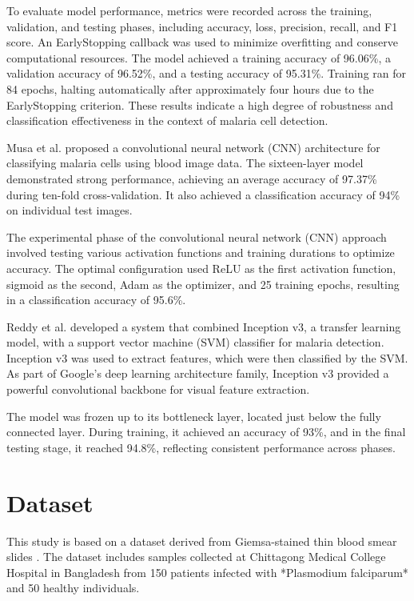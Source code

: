 \documentclass[journal,12pt,onecolumn,draftcls]{IEEEtran}
\begin{document}
To evaluate model performance, metrics were recorded across the training, validation, and testing phases, including accuracy, loss, precision, recall, and F1 score. An EarlyStopping callback was used to minimize overfitting and conserve computational resources. The model achieved a training accuracy of 96.06\%, a validation accuracy of 96.52\%, and a testing accuracy of 95.31\%. Training ran for 84 epochs, halting automatically after approximately four hours due to the EarlyStopping criterion. These results indicate a high degree of robustness and classification effectiveness in the context of malaria cell detection.

Musa et al. \cite{musa2022} proposed a convolutional neural network (CNN) architecture for classifying malaria cells using blood image data. The sixteen-layer model demonstrated strong performance, achieving an average accuracy of 97.37\% during ten-fold cross-validation. It also achieved a classification accuracy of 94\% on individual test images.

The experimental phase of the convolutional neural network (CNN) approach involved testing various activation functions and training durations to optimize accuracy. The optimal configuration used ReLU as the first activation function, sigmoid as the second, Adam as the optimizer, and 25 training epochs, resulting in a classification accuracy of 95.6\%.

Reddy et al. \cite{reddy2021} developed a system that combined Inception v3, a transfer learning model, with a support vector machine (SVM) classifier for malaria detection. Inception v3 was used to extract features, which were then classified by the SVM. As part of Google’s deep learning architecture family, Inception v3 provided a powerful convolutional backbone for visual feature extraction.

The model was frozen up to its bottleneck layer, located just below the fully connected layer. During training, it achieved an accuracy of 93\%, and in the final testing stage, it reached 94.8\%, reflecting consistent performance across phases.

\section{Dataset}
This study is based on a dataset derived from Giemsa-stained thin blood smear slides \cite{chakradeo2020}. The dataset includes samples collected at Chittagong Medical College Hospital in Bangladesh from 150 patients infected with *Plasmodium falciparum* and 50 healthy individuals.
\end{document}
